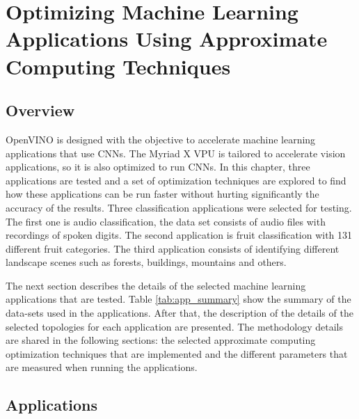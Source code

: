 \chapter{Optimizing Machine Learning Applications Using Approximate Computing Techniques}
\label{ch:ch2}

\section{Overview}

OpenVINO is designed with the objective to accelerate machine learning applications that use CNNs. The Myriad X VPU is tailored to accelerate vision applications, so it is also optimized to run CNNs. In this chapter, three applications are tested and a set of optimization techniques are explored to find how these applications can be run faster without hurting significantly the accuracy of the results. Three classification applications were selected for testing. The first one is audio classification, the data set consists of audio files with recordings of spoken digits. The second application is fruit classification with 131 different fruit categories. The third application consists of identifying different landscape scenes such as forests, buildings, mountains and others.

The next section describes the details of the selected machine learning applications that are tested. Table \ref{tab:app_summary} show the summary of the data-sets used in the applications. After that, the description of the details of the selected topologies for each application are presented. The methodology details are shared in the following sections: the selected approximate computing optimization techniques that are implemented and the different parameters that are measured when running the applications.

\section{Applications}

